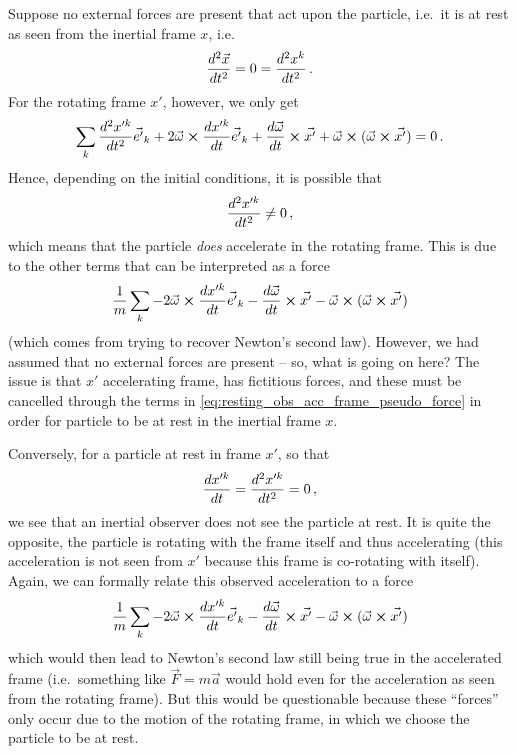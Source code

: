 \documentclass[../class_mech_main.tex]{subfiles}
\begin{document}
Suppose no external forces are present that act upon the particle, i.e.~it is at rest as seen from the inertial frame $x$, i.e.
\begin{equation*}
	\dv[2]{\vec{x}}{t} = 0 = \dv[2]{x^k}{t} \, .
\end{equation*}
For the rotating frame $x'$, however, we only get
\begin{equation*}
	 \sum_k \dv[2]{x'^k}{t} \vec{e'}_k + 2 \vec{\omega} \cross \dv{x'^k}{t} \vec{e'}_k + \dv{\vec{\omega}}{t} \cross \vec{x'} + \vec{\omega} \cross (\vec{\omega} \cross \vec{x'}) = 0 \, .
\end{equation*}
Hence, depending on the initial conditions, it is possible that
\begin{equation}
	\dv[2]{x'^k}{t} \neq 0 \, ,
\end{equation}
which means that the particle \emph{does} accelerate in the rotating frame. This is due to the other terms that can be interpreted as a force
\begin{equation}\label{eq:resting_obs_acc_frame_pseudo_force}
	\frac{1}{m} \sum_k - 2 \vec{\omega} \cross \dv{x'^k}{t} \vec{e'}_k - \dv{\vec{\omega}}{t} \cross \vec{x'} - \vec{\omega} \cross (\vec{\omega} \cross \vec{x'})
\end{equation}
(which comes from trying to recover Newton's second law). However, we had assumed that no external forces are present -- so, what is going on here? The issue is that $x'$ accelerating frame, has fictitious forces, and these must be cancelled through the terms in \eqref{eq:resting_obs_acc_frame_pseudo_force} in order for particle to be at rest in the inertial frame $x$.

Conversely, for a particle at rest in frame $x'$, so that
\begin{equation}
	\dv{x'^k}{t} = \dv[2]{x'^k}{t} = 0 \, ,
\end{equation}
we see that an inertial observer does not see the particle at rest. It is quite the opposite, the particle is rotating with the frame itself and thus accelerating (this acceleration is not seen from $x'$ because this frame is co-rotating with itself). Again, we can formally relate this observed acceleration to a force
\begin{equation}
	\frac{1}{m} \sum_k - 2 \vec{\omega} \cross \dv{x'^k}{t} \vec{e'}_k - \dv{\vec{\omega}}{t} \cross \vec{x'} - \vec{\omega} \cross (\vec{\omega} \cross \vec{x'})
\end{equation}
which would then lead to Newton's second law still being true in the accelerated frame (i.e.~something like $\vec{F} = m \vec{a}$ would hold even for the acceleration as seen from the rotating frame). But this would be questionable because these \enquote{forces} only occur due to the motion of the rotating frame, in which we choose the particle to be at rest. 
\end{document}
